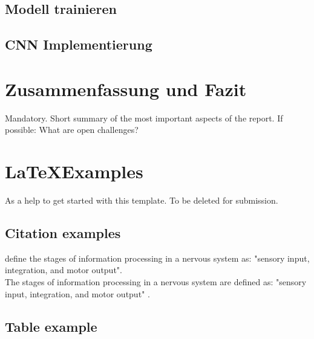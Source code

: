 

\subsection{Modell trainieren}



\subsection{CNN Implementierung}







\section{Zusammenfassung und Fazit}
Mandatory. Short summary of the most important aspects of the report.
If possible: What are open challenges?

\newpage
\section{\LaTeX Examples}
As a help to get started with this template. To be deleted for submission.
\subsection{Citation examples}
\citet{campbell:2017} define the stages of information processing in a nervous system as: "sensory input, integration, and motor output". \\
The stages of information processing in a nervous system are defined as: "sensory input, integration, and motor output" \citep{campbell:2017}. 

\subsection{Table example}



